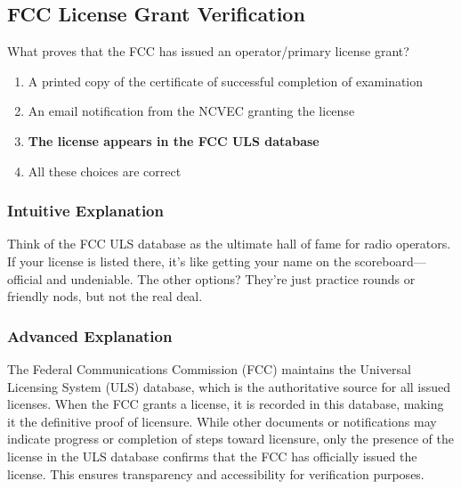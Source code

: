 \subsection{FCC License Grant Verification}
\label{T1A05}

\begin{tcolorbox}[colback=gray!10!white,colframe=black!75!black,title=T1A05]
What proves that the FCC has issued an operator/primary license grant?
\begin{enumerate}[label=\Alph*,noitemsep]
    \item A printed copy of the certificate of successful completion of examination
    \item An email notification from the NCVEC granting the license
    \item \textbf{The license appears in the FCC ULS database}
    \item All these choices are correct
\end{enumerate}
\end{tcolorbox}

\subsubsection*{Intuitive Explanation}
Think of the FCC ULS database as the ultimate hall of fame for radio operators. If your license is listed there, it's like getting your name on the scoreboard—official and undeniable. The other options? They're just practice rounds or friendly nods, but not the real deal.

\subsubsection*{Advanced Explanation}
The Federal Communications Commission (FCC) maintains the Universal Licensing System (ULS) database, which is the authoritative source for all issued licenses. When the FCC grants a license, it is recorded in this database, making it the definitive proof of licensure. While other documents or notifications may indicate progress or completion of steps toward licensure, only the presence of the license in the ULS database confirms that the FCC has officially issued the license. This ensures transparency and accessibility for verification purposes.